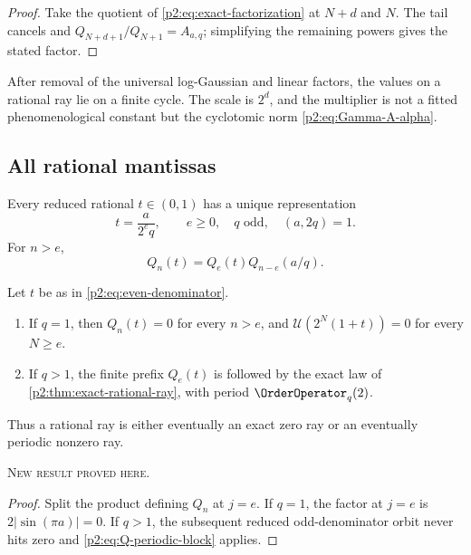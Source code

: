 \documentclass[11pt,oneside]{article}
\theoremstyle{definition}
\theoremstyle{remark}
\newcommand{\newresult}{\textcolor{newgreen}{\textsc{New result proved here.}}}
\begin{document}
\begin{proof}
Take the quotient of \eqref{p2:eq:exact-factorization} at $N+d$ and $N$. The tail
cancels and $Q_{N+d+1}/Q_{N+1}=A_{a,q}$; simplifying the remaining powers gives
the stated factor.
\end{proof}

\begin{remark}
After removal of the universal log-Gaussian and linear factors, the values on a
rational ray lie on a finite cycle. The scale is $2^d$, and the multiplier is not a
fitted phenomenological constant but the cyclotomic norm \eqref{p2:eq:Gamma-A-alpha}.
\end{remark}

\subsection{All rational mantissas}

Every reduced rational $t\in(0,1)$ has a unique representation
\begin{equation}
 t=\frac{a}{2^eq},\qquad e\ge0,\quad q\text{ odd},\quad(a,2q)=1.
 \label{p2:eq:even-denominator}
\end{equation}
For $n>e$,
\begin{equation}
 Q_n(t)=Q_e(t)Q_{n-e}(a/q).
 \label{p2:eq:preperiod-Q}
\end{equation}

\begin{corollary}\label{p2:cor:all-rational-rays}
Let $t$ be as in \eqref{p2:eq:even-denominator}.
\begin{enumerate}
 \item If $q=1$, then $Q_n(t)=0$ for every $n>e$, and
 $\mathscr U(2^N(1+t))=0$ for every $N\ge e$.
 \item If $q>1$, the finite prefix $Q_e(t)$ is followed by the exact law of
 \cref{p2:thm:exact-rational-ray}, with period $\OrderOperator_q(2)$.
\end{enumerate}
Thus a rational ray is either eventually an exact zero ray or an eventually
periodic nonzero ray.

\smallskip\noindent\newresult
\end{corollary}

\begin{proof}
Split the product defining $Q_n$ at $j=e$. If $q=1$, the factor at $j=e$ is
$2|\sin(\pi a)|=0$. If $q>1$, the subsequent reduced odd-denominator orbit never
hits zero and \eqref{p2:eq:Q-periodic-block} applies.
\end{proof}
\end{document}
